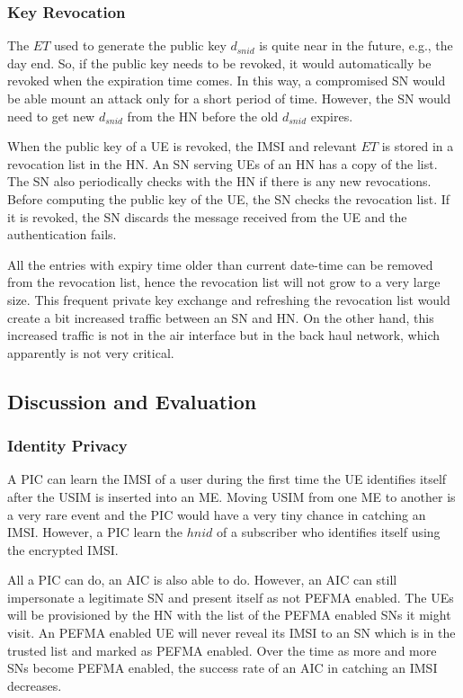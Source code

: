 \documentclass{river-journal}
\begin{document}
\subsubsection{Key Revocation}
The $ET$ used to generate the public key $d_{snid}$ is quite near in the future, e.g., the day end. So, if the public key needs to be revoked, it would automatically be revoked when the expiration time comes. In this way, a compromised SN would be able mount an attack only for a short period of time. However, the SN would need to get new $d_{snid}$ from the HN before the old $d_{snid}$ expires. 

When the public key of a UE is revoked, the IMSI and relevant $ET$ is stored in a revocation list in the HN.  An SN serving UEs of an HN has a copy of the list. The SN also periodically checks with the HN if there is any new revocations. Before computing the public key of the UE, the SN checks the revocation list. If it is revoked, the SN discards the message received from the UE and the authentication fails. 

All the entries with expiry time older than current date-time can be removed from the revocation list, hence the revocation list will not grow to a very large size. This frequent private key exchange and refreshing the revocation list would create a bit increased traffic between an SN and HN. On the other hand, this increased traffic is not in the air interface but in the back haul network, which apparently is not very critical. 

\subsection{Discussion and Evaluation}
\subsubsection{Identity Privacy}
A PIC can learn the IMSI of a user during the first time the UE identifies itself after the USIM is inserted into an ME. Moving USIM from one ME to another is a very rare event and the PIC would have a very tiny chance in catching an IMSI. However, a PIC learn the $hnid$ of a subscriber who identifies itself using the encrypted IMSI.

All a PIC can do, an AIC is also able to do. However, an AIC can still impersonate a legitimate SN and present itself as not PEFMA enabled. The UEs will be provisioned by the HN with the list of the PEFMA enabled SNs it might visit. An PEFMA enabled UE will never reveal its IMSI to an SN which is in the trusted list and marked as PEFMA enabled. Over the time as more and more SNs become PEFMA enabled, the success rate of an AIC in catching an IMSI decreases.
\end{document}
